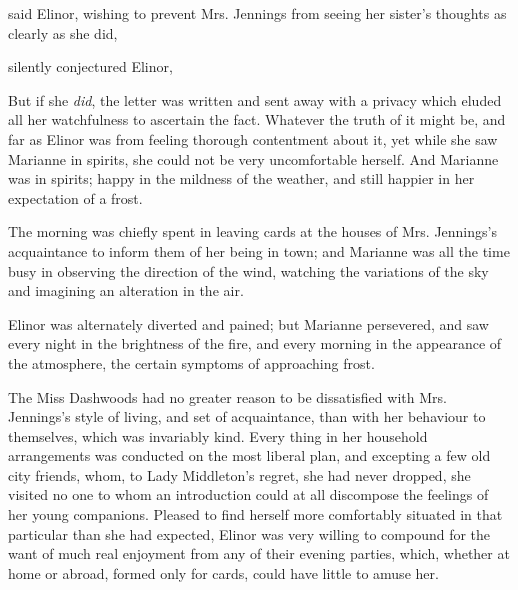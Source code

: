 said Elinor, wishing to prevent Mrs. Jennings from seeing her sister's thoughts as clearly as she did, 


 silently conjectured Elinor, 

But if she {\em did}, the letter was written and sent away with a privacy which eluded all her watchfulness to ascertain the fact. Whatever the truth of it might be, and far as Elinor was from feeling thorough contentment about it, yet while she saw Marianne in spirits, she could not be very uncomfortable herself. And Marianne was in spirits; happy in the mildness of the weather, and still happier in her expectation of a frost.

The morning was chiefly spent in leaving cards at the houses of Mrs. Jennings's acquaintance to inform them of her being in town; and Marianne was all the time busy in observing the direction of the wind, watching the variations of the sky and imagining an alteration in the air.


Elinor was alternately diverted and pained; but Marianne persevered, and saw every night in the brightness of the fire, and every morning in the appearance of the atmosphere, the certain symptoms of approaching frost.

The Miss Dashwoods had no greater reason to be dissatisfied with Mrs. Jennings's style of living, and set of acquaintance, than with her behaviour to themselves, which was invariably kind. Every thing in her household arrangements was conducted on the most liberal plan, and excepting a few old city friends, whom, to Lady Middleton's regret, she had never dropped, she visited no one to whom an introduction could at all discompose the feelings of her young companions. Pleased to find herself more comfortably situated in that particular than she had expected, Elinor was very willing to compound for the want of much real enjoyment from any of their evening parties, which, whether at home or abroad, formed only for cards, could have little to amuse her.

